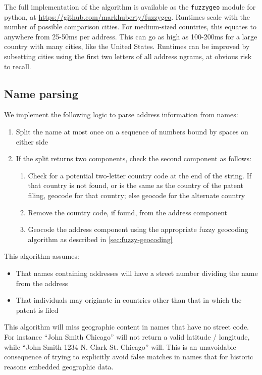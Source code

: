 \documentclass[11pt]{article}
\begin{document}
The full implementation of the algorithm is available as the
\texttt{fuzzygeo} module for python, at
\url{https://github.com/markhuberty/fuzzygeo}. Runtimes scale with the
number of possible comparison cities. For medium-sized
countries, this equates to anywhere from 25-50ms per address. This can
go as high as 100-200ms for a large country with many cities, like the
United States. Runtimes can be improved by subsetting cities using the
first two letters of all address ngrams, at obvious risk to
recall. 

\subsection{Name parsing}
\label{sec:name-parsing}

We implement the following logic to parse address information from
names:
\begin{enumerate}
\item Split the name at most once on a sequence of numbers bound by
  spaces on either side
\item If the split returns two components, check the second component
  as follows:
  \begin{enumerate}
  \item Check for a potential two-letter country code at the end of
    the string. If that country is not found, or is the same as the
    country of the patent filing, geocode for that country; else
    geocode for the alternate country
  \item Remove the country code, if found, from the address component
  \item Geocode the address component using the appropriate fuzzy
    geocoding algorithm as described in \ref{sec:fuzzy-geocoding}
  \end{enumerate}
\end{enumerate}

This algorithm assumes:
\begin{itemize}
\item That names containing addresses will have a street number
  dividing the name from the address
\item That individuals may originate in countries other than that
  in which the patent is filed
\end{itemize}

This algorithm will miss geographic content in names that have no
street code. For instance ``John Smith Chicago'' will not return a
valid latitude / longitude, while ``John Smith 1234 N. Clark
St. Chicago'' will. This is an unavoidable consequence of trying to
explicitly avoid false matches in names that for historic reasons
embedded geographic data. 
\end{document}
